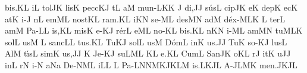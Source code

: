 \sgn bi{s.}\punctum K\augmentum L\egn
\spatium
\divisiofinalis
\spatium
{}i{}\punctum L\egn
\spatium
\sgn t{o}l\pes JK\egn
\sgn lis\punctum K\egn
\spatium
\sgn pe{cc}\clivis KJ\egn
{}t\punctum L\egn
\sgn {}a{}\punctum M\egn
\spatium
\sgn m{u}{n-}\clivis LK\punctum K\egn
\custos J
\lineaproxima
\sgn di,\punctum J\augmentum J\egn
\spatium
\divisiominima
\spatium
\sgn s{\'u}s\punctum L\egn
\sgn cip\pes JK\egn
\sgn {}e{}\punctum K\egn
\spatium
\sgn dep\punctum K\egn
{}ec\punctum K\egn
\sgn {}at\punctum K\egn
\sgn {}i-\punctum J\egn
{}n\punctum L\egn
\sgn {}em\clivis ML\egn
\spatium
\sgn n{o}{st}\punctum K\augmentum L\egn
\sgn ra{m.}\punctum K\augmentum L\egn
\spatium
\divisiofinalis
\spatium
{}i{}\pes KN\egn
\spatium
\sgn s{e}-\clivis ML\egn
\sgn des\pes MN\egn
\spatium
\sgn {}ad\punctum M\egn
\spatium
\sgn d{\'e}{x-}\climacus MLK\egn
\custos L
\lineaproxima
\sgn ter\punctum L\egn
\sgn {}am\punctum M\egn
\spatium
\sgn P{a}{-}\punctum L\augmentum L\egn
{}i{s,}\punctum K\augmentum L\egn
\spatium
\divisiominima
\spatium
\sgn mis\punctum K\egn
\sgn {}e-\clivis KJ\egn
\sgn r{\'e}r\punctum L\egn
\sgn {}e{}\clivis ML\egn
\spatium
\sgn n{o}-\punctum K\augmentum L\egn
\sgn bi{s.}\punctum K\augmentum L\egn
\spatium
\divisiofinalis
\spatium
{}n\pes KN\egn
\sgn {}i-\clivis ML\egn
\sgn {}am\pes MN\egn
\spatium
\sgn tu{}\climacus MLK\egn
\spatium
\sgn s{o}l\punctum L\egn
\sgn {}us\punctum M\egn
\spatium
\custos L
\lineaproxima
\sgn s{a}{nc}\punctum L\augmentum L\egn
\sgn tu{s.}\punctum K\augmentum L\egn
\spatium
\divisiofinalis
\spatium
\sgn Tu{}\clivis KJ\egn
\spatium
\sgn s{o}l\punctum L\egn
\sgn {}us\punctum M\egn
\spatium
\sgn D{\'o}m\punctum L\egn
\sgn {}in\punctum K\egn
\sgn {}u{s.}\punctum J\augmentum J\egn
\spatium
\divisiofinalis
\spatium
\sgn Tu{}\punctum K\egn
\spatium
\sgn s{o}-\clivis KJ\egn
\sgn lus\punctum L\egn
\spatium
\sgn {}Al\punctum M\egn
\sgn t{\'\i}s\punctum L\egn
\sgn sim\punctum K\egn
\sgn {}u{s,}\punctum J\augmentum J\egn
\spatium
\divisiominima
\spatium
\custos K
\lineaproxima
\sgn J{e}-\clivis KJ\egn
\sgn su{}\torculus LML\egn
\spatium
{}\punctum K\augmentum L\egn
\sgn {}e.\punctum K\augmentum L\egn
\spatium
\divisiofinalis
\spatium
\sgn Cum\punctum L\egn
\spatium
\sgn S{a}{n}\pes JK\egn
{}o{}\pes KL\egn
\spatium
{}r\punctum J\egn
\sgn {}it\punctum K\egn
\sgn {}u{}\punctum J\augmentum J\egn
\spatium
\divisiominima
\spatium
\sgn {}in\punctum L\egn
\spatium
{}r\punctum N\egn
\sgn {}i-\punctum N\egn
\sgn {}a{}\pes Na\egn
\spatium
\sgn D{e}-\climacus NML\egn
\sgn {}i{}\punctum L\augmentum L\egn
\spatium
\custos L
\lineaproxima
\sgn P{a}-\pes LN\Climacus NMKJ\quilisma K\nonspatium\pes LM\egn
{}i{s.}\clivis LK\augmentumduplex JL\egn
\spatium
\divisiofinalis
\spatium
\sgn {}A-\pes JL\clivis MK\egn
\sgn me{n.}\pes JK\augmentumduplex JL\egn
\spatium
\Finisgregoriana

